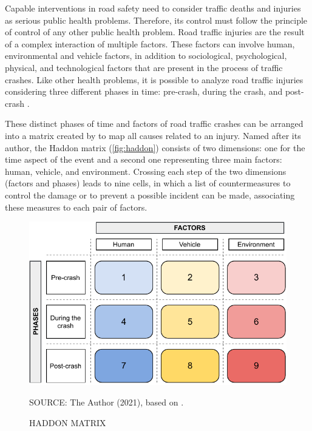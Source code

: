 Capable interventions in road safety need to consider traffic deaths and injuries as serious public health problems. Therefore, its control must follow the principle of control of any other public health problem. Road traffic injuries are the result of a complex interaction of multiple factors. These factors can involve human, environmental and vehicle factors, in addition to sociological, psychological, physical, and technological factors that are present in the process of traffic crashes. Like other health problems, it is possible to analyze road traffic injuries considering three different phases in time: pre-crash, during the crash, and post-crash \cite{Mohan2016}.

These distinct phases of time and factors of road traffic crashes can be arranged into a matrix created by \textcite{Haddon1980} to map all causes related to an injury. Named after its author, the Haddon matrix (\autoref{fig:haddon}) consists of two dimensions: one for the time aspect of the event and a second one representing three main factors: human, vehicle, and environment. Crossing each step of the two dimensions (factors and phases) leads to nine cells, in which a list of countermeasures to control the damage or to prevent a possible incident can be made, associating these measures to each pair of factors. 

\begin{figure}[!htbp]
    \centering\footnotesize
    \captionsetup{font=footnotesize}
    \caption{HADDON MATRIX}
    \includegraphics{fig/haddon.pdf}
    \label{fig:haddon}
    \par SOURCE: The Author (2021), based on \textcite{Haddon1980}.
\end{figure} 


